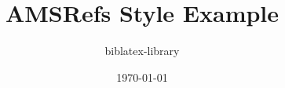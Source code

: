 \documentclass[12pt, a4paper]{article}
\title{AMSRefs Style Example}
\author{biblatex-library}
\date{\today}
\begin{document}
\nocite{*}

\end{document}
